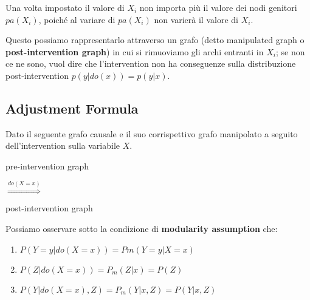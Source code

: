 Una volta impostato il valore di $X_i$ non importa più il valore dei nodi genitori $pa(X_i)$, poiché al variare di $pa(X_i)$ non varierà il valore di $X_i$.

Questo possiamo rappresentarlo attraverso un grafo (detto manipulated graph o \textbf{post-intervention graph}) in cui si rimuoviamo gli archi entranti in $X_i$; se non ce ne sono, vuol dire che l'intervention non ha conseguenze sulla distribuzione post-intervention
$p(y|do(x)) = p(y|x)$.

\subsection*{Adjustment Formula}
Dato il seguente grafo causale e il suo corrispettivo grafo manipolato a seguito dell'intervention sulla variabile $X$.

\begin{center}
  \begin{minipage}{0.4\linewidth}
    \centering

    pre-intervention graph
  \end{minipage}
  {\Large$\overset{do(X = x)}{\Longrightarrow}$}
  \begin{minipage}{0.4\linewidth}
    \centering

    post-intervention graph
  \end{minipage}
\end{center}

Possiamo osservare sotto la condizione di \textbf{modularity assumption} che:
\begin{enumerate}
  \item $P(Y = y|do(X = x)) = Pm (Y = y|X = x)$
  \item $P(Z|do(X=x)) = P_m(Z|x) = P(Z)$
  \item $P(Y|do(X=x), Z) = P_m(Y|x,Z) = P(Y|x,Z)$
\end{enumerate}


